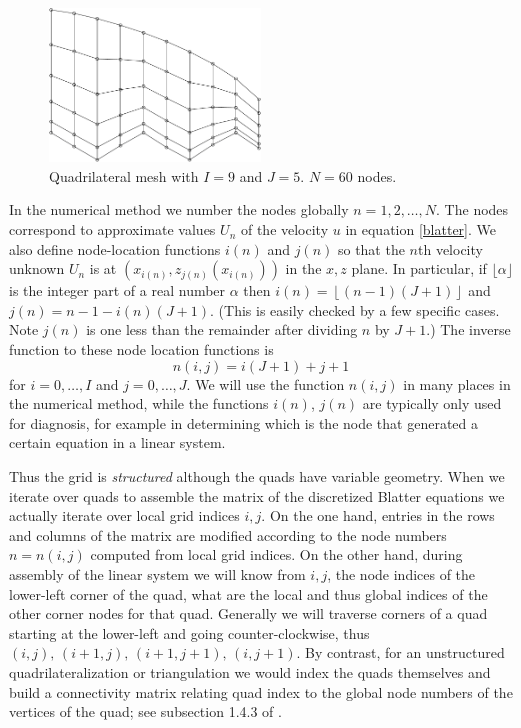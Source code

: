 \documentclass[11pt,final,reqno]{amsart}
\theoremstyle{remark}
\theoremstyle{definition}
\begin{document}
\begin{figure}[ht] 
\includegraphics[width=0.5\textwidth]{figs/q1mesh}
\caption{Quadrilateral mesh with $I=9$ and $J=5$.  $N=60$ nodes.}
\label{fig:q1mesh}
\end{figure}

In the numerical method we number the nodes globally $n=1,2,\dots,N$.  The nodes correspond to approximate values $U_n$ of the velocity $u$ in equation \eqref{blatter}.  We also define node-location functions $i(n)$ and $j(n)$ so that the $n$th velocity unknown $U_n$ is at $\left(x_{i(n)},z_{j(n)}(x_{i(n)})\right)$ in the $x,z$ plane.  In particular, if $\lfloor \alpha\rfloor$ is the integer part of a real number $\alpha$ then $i(n) = \left\lfloor (n-1)(J+1) \right\rfloor$ and $j(n) = n - 1 - i(n)(J+1)$.  (This is easily checked by a few specific cases.  Note $j(n)$ is one less than the remainder after dividing $n$ by $J+1$.)  The inverse function to these node location functions is
\begin{equation}
  n(i,j) = i(J+1) + j + 1  \label{localtoglobal}
\end{equation}
for $i=0,\dots,I$ and $j=0,\dots,J$.  We will use the function $n(i,j)$ in many places in the numerical method, while the functions $i(n)$, $j(n)$ are typically only used for diagnosis, for example in determining which is the node that generated a certain equation in a linear system.

Thus the grid is \emph{structured} although the quads have variable geometry.  When we iterate over quads to assemble the matrix of the discretized Blatter equations we actually iterate over local grid indices $i,j$.  On the one hand, entries in the rows and columns of the matrix are modified according to the node numbers $n=n(i,j)$ computed from local grid indices.  On the other hand, during assembly of the linear system we will know from $i,j$, the node indices of the lower-left corner of the quad, what are the local and thus global indices of the other corner nodes for that quad.  Generally we will traverse corners of a quad starting at the lower-left and going counter-clockwise, thus $(i,j),\,(i+1,j),\,(i+1,j+1),\,(i,j+1)$.  By contrast, for an unstructured quadrilateralization or triangulation we would index the quads themselves and build a connectivity matrix relating quad index to the global node numbers of the vertices of the quad; see subsection 1.4.3 of \cite{Elmanetal2005}.
\end{document}
